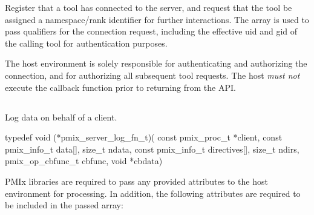 \optattrend

\descr

Register that a tool has connected to the server, and request that the tool be assigned a namespace/rank identifier for further interactions.
The  array is used to pass qualifiers for the connection request, including the effective uid and gid of the calling tool for authentication purposes.

\advicermstart
The host environment is solely responsible for authenticating and authorizing the connection, and for authorizing all subsequent tool requests. The host \emph{must not} execute the callback function prior to returning from the \ac{API}.

\advicermend


\subsection{}

\summary

Log data on behalf of a client.

\format

\cspecificstart
\begin{codepar}
typedef void (*pmix_server_log_fn_t)(
                             const pmix_proc_t *client,
                             const pmix_info_t data[], size_t ndata,
                             const pmix_info_t directives[], size_t ndirs,
                             pmix_op_cbfunc_t cbfunc, void *cbdata)
\end{codepar}
\cspecificend

\begin{arglist}
\end{arglist}


\reqattrstart
\ac{PMIx} libraries are required to pass any provided attributes to the host environment for processing. In addition, the following attributes are required to be included in the passed  array:

